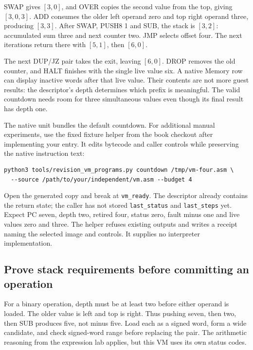 SWAP gives \([3,0]\), and OVER copies the second value from the top, giving
\([3,0,3]\). ADD consumes the older left operand zero and top right operand
three, producing \([3,3]\). After SWAP, PUSH8 1 and SUB, the stack is
\([3,2]\): accumulated sum three and next counter two. JMP selects offset four.
The next iterations return there with \([5,1]\), then \([6,0]\).

The next DUP/JZ pair takes the exit, leaving \([6,0]\). DROP removes the old
counter, and HALT finishes with the single live value six. A native Memory row
can display inactive words after that live value. Their contents are not more
guest results: the descriptor's depth determines which prefix is meaningful.
The valid countdown needs room for three simultaneous values even though its
final result has depth one.





The native unit bundles the default countdown. For additional manual experiments,
use the fixed fixture helper from the book checkout after implementing your entry. It edits bytecode
and caller controls while preserving the native instruction text:
\begin{verbatim}
python3 tools/revision_vm_programs.py countdown /tmp/vm-four.asm \
  --source /path/to/your/independent/vm.asm --budget 4
\end{verbatim}
Open the generated copy and break at \texttt{vm\_ready}. The descriptor already
contains the return state; the caller has not stored \texttt{last\_status} and
\texttt{last\_steps} yet. Expect PC seven, depth two, retired four, status zero,
fault minus one and live values zero and three. The helper refuses existing
outputs and writes a receipt naming the selected image and controls. It
supplies no interpreter implementation.



\subsection*{Prove stack requirements before committing an operation}

For a binary operation, depth must be at least two before either operand is
loaded. The older value is left and top is right. Thus pushing seven, then
two, then SUB produces five, not minus five. Load each as a signed word, form
a wide candidate, and check signed-word range before replacing the pair.
The arithmetic reasoning from the expression lab applies, but this VM uses
its own status codes.

